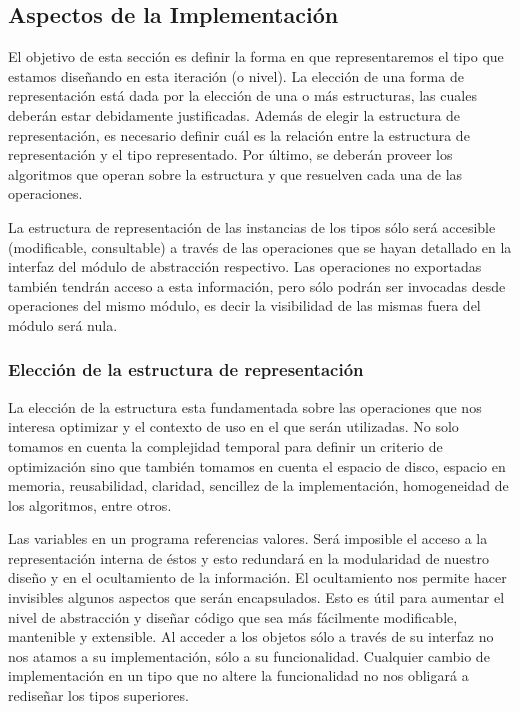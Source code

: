 \documentclass[10pt, a4paper]{report}
\begin{document}
\subsection{Aspectos de la Implementaci\'on}

El objetivo de esta secci\'on es definir la forma en que representaremos el tipo que estamos dise\~nando en esta iteraci\'on (o nivel). La elecci\'on de una forma de representaci\'on est\'a dada por la elecci\'on de una o m\'as estructuras, las cuales deber\'an estar debidamente justificadas. Adem\'as de elegir la estructura de representaci\'on, es necesario definir cu\'al es la relaci\'on entre la estructura de representaci\'on y el tipo representado. Por \'ultimo, se deber\'an proveer los algoritmos que operan sobre la estructura y que resuelven cada una de las operaciones.

La estructura de representaci\'on de las instancias de los tipos s\'olo ser\'a accesible (modificable, consultable) a trav\'es de las operaciones que se hayan detallado en la interfaz del m\'odulo de abstracci\'on respectivo. Las operaciones no exportadas tambi\'en tendr\'an acceso a esta informaci\'on, pero s\'olo podr\'an ser invocadas desde operaciones del mismo m\'odulo, es decir la visibilidad de las mismas fuera del m\'odulo ser\'a nula.

\subsubsection{Elecci\'on de la estructura de representaci\'on} %

La elecci\'on de la estructura esta fundamentada sobre las operaciones que nos interesa optimizar y el contexto de uso en el que ser\'an utilizadas. No solo tomamos en cuenta la complejidad temporal para definir un criterio de optimizaci\'on sino que tambi\'en tomamos en cuenta el espacio de disco, espacio en memoria, reusabilidad, claridad, sencillez de la implementaci\'on, homogeneidad de los algoritmos, entre otros.

Las variables en un programa referencias valores. Ser\'a imposible el acceso a la representaci\'on interna de \'estos y esto redundar\'a en la modularidad de nuestro dise\~no y en el ocultamiento de la informaci\'on. El ocultamiento nos permite hacer invisibles algunos aspectos que ser\'an encapsulados. Esto es \'util para aumentar el nivel de abstracci\'on y dise\~nar c\'odigo que sea m\'as f\'acilmente modificable, mantenible y extensible. Al acceder a los objetos s\'olo a trav\'es de su interfaz no nos atamos a su implementaci\'on, s\'olo a su funcionalidad. Cualquier cambio de implementaci\'on en un tipo que no altere la funcionalidad no nos obligar\'a a redise\~nar los tipos superiores.
\end{document}
